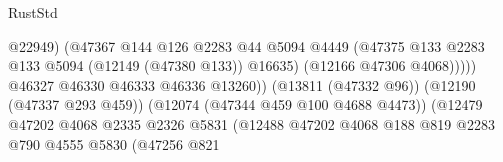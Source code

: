 \begin{lexlean}{RustStd}
\begin{coremodule}
                                                            @22949)
                                                          (@47367
                                                            @144
                                                            @126
                                                            @2283
                                                            @44
                                                            @5094
                                                            @4449
                                                            (@47375
                                                              @133
                                                              @2283
                                                              @133
                                                              @5094
                                                              (@12149 (@47380 @133))
                                                              @16635)
                                                            (@12166 @47306 @4068)))))
                                                    @46327
                                                    @46330
                                                    @46333
                                                    @46336
                                                    @13260))
                                                (@13811 (@47332 @96))
                                                (@12190 (@47337 @293 @459))
                                                (@12074 (@47344 @459 @100 @4688 @4473))
                                                (@12479
                                                  @47202
                                                  @4068
                                                  @2335
                                                  @2326
                                                  @5831
                                                  (@12488
                                                    @47202
                                                    @4068
                                                    @188
                                                    @819
                                                    @2283
                                                    @790
                                                    @4555
                                                    @5830
                                                    (@47256
                                                      @821

\end{coremodule}
\end{lexlean}
